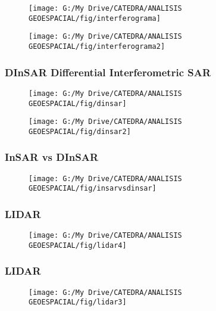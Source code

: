 \documentclass[14pt]{beamer}
\begin{document}
\begin{frame}
 \begin{figure}
    \centering
    \texttt{[image: G:/My Drive/CATEDRA/ANALISIS GEOESPACIAL/fig/interferograma]}
  \end{figure}
\end{frame}
\begin{frame}
 \begin{figure}
    \centering
    \texttt{[image: G:/My Drive/CATEDRA/ANALISIS GEOESPACIAL/fig/interferograma2]}
  \end{figure}
\end{frame}
\begin{frame}
\frametitle{DInSAR Differential Interferometric SAR}
 \begin{figure}
    \centering
    \texttt{[image: G:/My Drive/CATEDRA/ANALISIS GEOESPACIAL/fig/dinsar]}
  \end{figure}
\end{frame}
\begin{frame}
 \begin{figure}
    \centering
    \texttt{[image: G:/My Drive/CATEDRA/ANALISIS GEOESPACIAL/fig/dinsar2]}
  \end{figure}
\end{frame}
\begin{frame}
\frametitle{InSAR vs DInSAR}
 \begin{figure}
    \centering
    \texttt{[image: G:/My Drive/CATEDRA/ANALISIS GEOESPACIAL/fig/insarvsdinsar]}
  \end{figure}
\end{frame}
\begin{frame}
\frametitle{LIDAR}
 \begin{figure}
    \centering
    \texttt{[image: G:/My Drive/CATEDRA/ANALISIS GEOESPACIAL/fig/lidar4]}
  \end{figure}
\end{frame}
\begin{frame}
\frametitle{LIDAR}
 \begin{figure}
    \centering
    \texttt{[image: G:/My Drive/CATEDRA/ANALISIS GEOESPACIAL/fig/lidar3]}
  \end{figure}
\end{frame}
\end{document}
